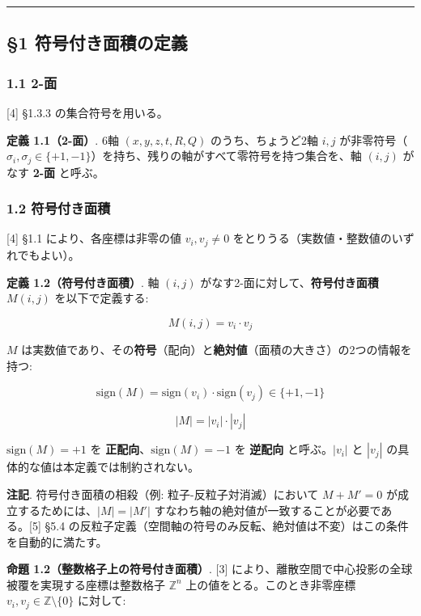 \documentclass[
  a4paper,11pt]{ltjsarticle}
\begin{document}
\begin{center}\rule{0.5\linewidth}{0.5pt}\end{center}

\subsection{§1
符号付き面積の定義}\label{ux7b26ux53f7ux4ed8ux304dux9762ux7a4dux306eux5b9aux7fa9}

\subsubsection{1.1 2-面}\label{ux9762}

{[}4{]} §1.3.3 の集合符号を用いる。

\textbf{定義 1.1（2-面）}. 6軸 \((x, y, z, t, R, Q)\)
のうち、ちょうど2軸 \(i, j\)
が非零符号（\(\sigma_i, \sigma_j \in \{+1, -1\}\)）を持ち、残りの軸がすべて零符号を持つ集合を、軸
\((i, j)\) がなす \textbf{2-面} と呼ぶ。

\subsubsection{1.2
符号付き面積}\label{ux7b26ux53f7ux4ed8ux304dux9762ux7a4d}

{[}4{]} §1.1 により、各座標は非零の値 \(v_i, v_j \neq 0\)
をとりうる（実数値・整数値のいずれでもよい）。

\textbf{定義 1.2（符号付き面積）}. 軸 \((i, j)\)
がなす2-面に対して、\textbf{符号付き面積} \(M(i, j)\) を以下で定義する:

\[M(i, j) = v_i \cdot v_j\]

\(M\)
は実数値であり、その\textbf{符号}（配向）と\textbf{絶対値}（面積の大きさ）の2つの情報を持つ:

\[\text{sign}(M) = \text{sign}(v_i) \cdot \text{sign}(v_j) \in \{+1, -1\}\]

\[|M| = |v_i| \cdot |v_j|\]

\(\text{sign}(M) = +1\) を \textbf{正配向}、\(\text{sign}(M) = -1\) を
\textbf{逆配向} と呼ぶ。\(|v_i|\) と \(|v_j|\)
の具体的な値は本定義では制約されない。

\textbf{注記}. 符号付き面積の相殺（例: 粒子-反粒子対消滅）において
\(M + M' = 0\) が成立するためには、\(|M| = |M'|\)
すなわち軸の絶対値が一致することが必要である。{[}5{]} §5.4
の反粒子定義（空間軸の符号のみ反転、絶対値は不変）はこの条件を自動的に満たす。

\textbf{命題 1.2（整数格子上の符号付き面積）}. {[}3{]}
により、離散空間で中心投影の全球被覆を実現する座標は整数格子
\(\mathbb{Z}^n\) 上の値をとる。このとき非零座標
\(v_i, v_j \in \mathbb{Z} \setminus \{0\}\) に対して:
\end{document}
